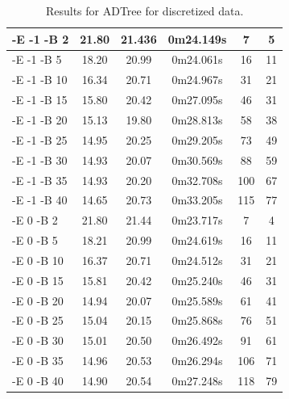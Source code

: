 \documentclass[a4paper]{llncs}
\begin{document}
\begin{table}[ht]
\begin{center}
\begin{tabular}{ | l | c | c | c | c | c |}
    -E -1 -B 2 & 21.80 & 21.436 & 0m24.149s & 7 & 5 \\ \hline
    -E -1 -B 5 & 18.20 & 20.99 & 0m24.061s & 16 & 11 \\ \hline
    -E -1 -B 10 & 16.34 & 20.71 & 0m24.967s & 31 & 21 \\ \hline
    -E -1 -B 15 & 15.80 & 20.42 & 0m27.095s & 46 & 31 \\ \hline
    -E -1 -B 20 & 15.13 & 19.80 & 0m28.813s & 58 & 38 \\ \hline
    -E -1 -B 25 & 14.95 & 20.25 & 0m29.205s & 73 & 49 \\ \hline
    -E -1 -B 30 & 14.93 & 20.07 & 0m30.569s & 88 & 59 \\ \hline
    -E -1 -B 35 & 14.93 & 20.20 & 0m32.708s & 100 & 67 \\ \hline
    -E -1 -B 40 & 14.65 & 20.73 & 0m33.205s & 115 & 77 \\ \hline
    
    -E 0 -B 2 & 21.80 & 21.44 & 0m23.717s & 7 & 4 \\ \hline
    -E 0 -B 5 & 18.21 & 20.99 & 0m24.619s & 16 & 11 \\ \hline
    -E 0 -B 10 & 16.37 & 20.71 & 0m24.512s & 31 & 21 \\ \hline
    -E 0 -B 15 & 15.81 & 20.42 & 0m25.240s & 46 & 31 \\ \hline
    -E 0 -B 20 & 14.94 & 20.07 & 0m25.589s & 61 & 41 \\ \hline
    -E 0 -B 25 & 15.04 & 20.15 & 0m25.868s & 76 & 51 \\ \hline
    -E 0 -B 30 & 15.01 & 20.50 & 0m26.492s & 91 & 61 \\ \hline
    -E 0 -B 35 & 14.96 & 20.53 & 0m26.294s & 106 & 71 \\ \hline
    -E 0 -B 40 & 14.90 & 20.54 & 0m27.248s & 118 & 79 \\ \hline
    
  \end{tabular}
  \caption{Results for ADTree for discretized data.}
  \label{tbl:results_adtree_discr}
  \end{center}
\end{table}
\end{document}
